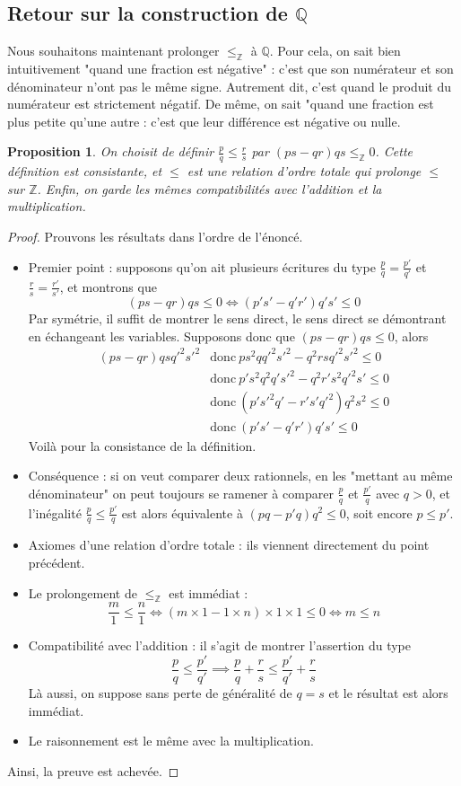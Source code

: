 \documentclass[french]{book}
\newcommand{\Z}{\mathbb{Z}}
\newcommand{\Q}{\mathbb{Q}}
\theoremstyle{plain}
\newtheorem{prop}{Proposition}[chapter]
\theoremstyle{definition}
\theoremstyle{remark}
\begin{document}
\subsection{Retour sur la construction de $\Q$}
Nous souhaitons maintenant prolonger $\leqslant_\Z$ à $\Q$. Pour cela, on sait bien intuitivement "quand une fraction est négative" : c'est que son numérateur et son dénominateur n'ont pas le même signe. Autrement dit, c'est quand le produit du numérateur est strictement négatif. De même, on sait "quand une fraction est plus petite qu'une autre : c'est que leur différence est négative ou nulle.
\begin{prop}
	On choisit de définir $\displaystyle \frac{p}{q}\leqslant\frac{r}{s}$ par $(ps-qr)qs\leqslant_\Z 0$. Cette définition est consistante, et $\leqslant$ est une relation d'ordre totale qui prolonge $\leqslant$ sur $\Z$. Enfin, on garde les mêmes compatibilités avec l'addition et la multiplication.
\end{prop}
\begin{proof}
	Prouvons les résultats dans l'ordre de l'énoncé.
	\begin{itemize}
		\item Premier point : supposons qu'on ait plusieurs écritures du type $\frac{p}{q}=\frac{p'}{q'}$ et $\frac{r}{s}=\frac{r'}{s'}$, et montrons que $$(ps-qr)qs\leqslant0 \iff (p's'-q'r')q's'\leqslant0$$ Par symétrie, il suffit de montrer le sens direct, le sens direct se démontrant en échangeant les variables. Supposons donc que $(ps-qr)qs\leqslant0$, alors 
		\begin{align*}
			(ps-qr)qsq'^2s'^2 &\text{donc} \ ps^2qq'^2s'^2-q^2rsq'^2s'^2\leqslant0 \\
			&\text{donc} \ p's^2q^2q's'^2-q^2r's^2q'^2s'\leqslant0 \\
			&\text{donc} \ (p's'^2q'-r's'q'^2)q^2s^2\leqslant0 \\
			&\text{donc} \ (p's'-q'r')q's'\leqslant0
		\end{align*}
		Voilà pour la consistance de la définition.
		\item Conséquence : si on veut comparer deux rationnels, en les "mettant au même dénominateur" on peut toujours se ramener à comparer $\displaystyle\frac{p}{q}$ et $\displaystyle\frac{p'}{q}$ avec $q>0$, et l'inégalité $\displaystyle\frac{p}{q}\leqslant\frac{p'}{q}$ est alors équivalente à $(pq-p'q)q^2\leqslant0$, soit encore $p\leqslant p'$.
		\item Axiomes d'une relation d'ordre totale : ils viennent directement du point précédent.
		\item Le prolongement de $\leqslant_\Z$ est immédiat : $$\frac{m}{1}\leqslant\frac{n}{1}\iff(m\times 1-1\times n)\times1\times1\leqslant0\iff m\leqslant n$$
		\item Compatibilité avec l'addition : il s'agit de montrer l'assertion du type $$\frac{p}{q}\leqslant\frac{p'}{q'}\implies \frac{p}{q}+\frac{r}{s}\leqslant\frac{p'}{q'}+\frac{r}{s}$$Là aussi, on suppose sans perte de généralité de $q=s$ et le résultat est alors immédiat.
		\item Le raisonnement est le même avec la multiplication.
	\end{itemize}
Ainsi, la preuve est achevée.
\end{proof}
\end{document}
